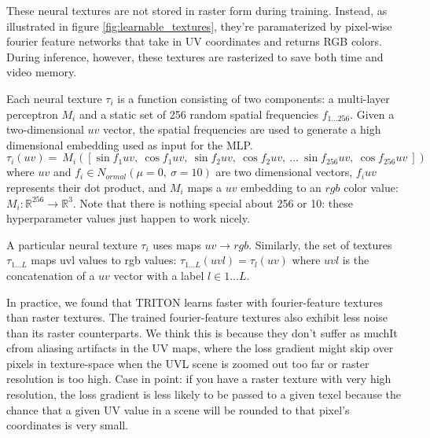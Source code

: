 \documentclass{article}
\begin{document}
	These neural textures are not stored in raster form during training. Instead, as illustrated in figure \ref{fig:learnable_textures}, they're paramaterized by pixel-wise fourier feature networks \cite{fourier_feature_networks} that take in UV coordinates and returns RGB colors. During inference, however, these textures are rasterized to save both time and video memory.
	
	Each neural texture $\tau_i$ is a function consisting of two components: a multi-layer perceptron $M_i$ and a static set of 256 random spatial frequencies $f_{1...256}$. 
	Given a two-dimensional $uv$ vector, the spatial frequencies are used to generate a high dimensional embedding used as input for the MLP.
	\begin{equation}
			\tau_i(uv) = 
			\
			M_i\left(\left[
				\sin f_1 uv, \ 
				\cos f_1 uv, \ 
				\sin f_2 uv, \ 
				\cos f_2 uv, \ 
				\dots \ 
				\sin f_{256} uv, \ 
				\cos f_{256} uv \ 
			\right]\right)
	\end{equation}
	where $uv$ and $f_i \in N_{ormal}(\mu=0,\ \sigma=10)$ are two dimensional vectors,
	 $f_i uv$ represents their dot product, 
	 and $M_i$ maps a $uv$ embedding to an $rgb$ color value:
	 $M_i: \mathbb{R}^{256} \rightarrow \mathbb{R}^3$.
	Note that there is nothing special about 256 or 10: these hyperparameter values just happen to work nicely.
	
	A particular neural texture $\tau_i$ uses maps $uv \rightarrow rgb$. Similarly, the set of textures $\tau_{1\dots L}$ maps uvl values to rgb values: $\tau_{1\dots L}(uvl)=\tau_l(uv)$ where $uvl$ is the concatenation of a $uv$ vector with a label $l \in 1\dots L$.
	
	In practice, we found that TRITON learns faster with fourier-feature textures than raster textures. The trained fourier-feature textures also exhibit less noise than its raster counterparts. We think this is because they don't suffer as muchIt cfrom aliasing artifacts in the UV maps, where the loss gradient might skip over pixels in texture-space when the UVL scene is zoomed out too far or raster resolution is too high. Case in point: if you have a raster texture with very high resolution, the loss gradient is less likely to be passed to a given texel because the chance that a given UV value in a scene will be rounded to that pixel's coordinates is very small.

\end{document}
